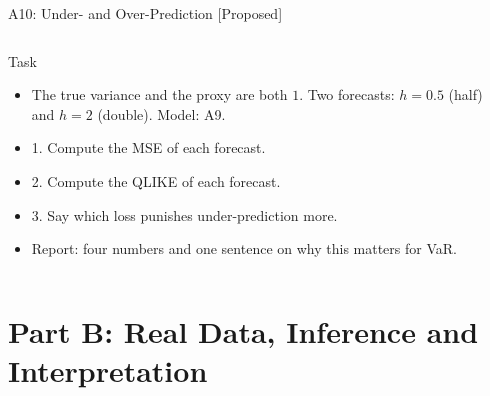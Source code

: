 \begin{frame}{A10: Under- and Over-Prediction [Proposed]}
\propsub
\itemsize{\scriptsize}
\begin{columns}[T]
\begin{column}{\taskw}
\begin{block}{Task}
\begin{itemize}
    \item The true variance and the proxy are both $1$. Two forecasts: $h = 0.5$ (half) and $h = 2$ (double). Model: A9.
    \item 1. Compute the MSE of each forecast.
    \item 2. Compute the QLIKE of each forecast.
    \item 3. Say which loss punishes under-prediction more.
    \item Report: four numbers and one sentence on why this matters for VaR.
\end{itemize}
\end{block}
\end{column}
\begin{column}{\solw}
\end{column}
\end{columns}
\end{frame}


\section{Part B: Real Data, Inference and Interpretation}

